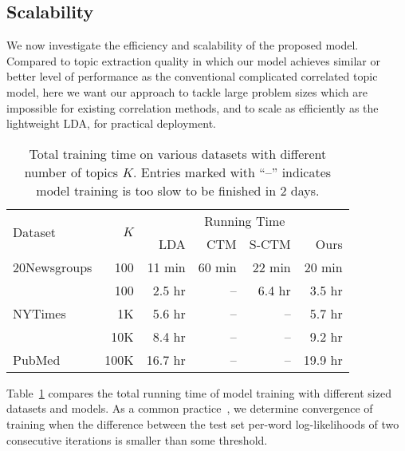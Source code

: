 \documentclass[sigconf]{acmart}
\begin{document}
\subsection{Scalability}
We now investigate the efficiency and scalability of the proposed model. Compared to topic extraction quality in which our model achieves similar or better level of performance as the conventional complicated correlated topic model, here we want our approach to tackle large problem sizes which are impossible for existing correlation methods, and to scale as efficiently as the lightweight LDA, for practical deployment.  

\begin{table}[!t]
\centering
\begin{tabular}{l r r r r r}
\cmidrule[\heavyrulewidth]{1-6}
\multirow{2}{*}{Dataset}  & \multirow{2}{*}{$K$}  & \multicolumn{4}{c}{Running Time} \\ \cmidrule(l){3-6}
 & & LDA & CTM & S-CTM & Ours \\ 
\cmidrule[\heavyrulewidth]{1-6}
20Newsgroups  & 100 & 11 min & 60 min & 22 min & 20 min\\
\cmidrule{1-6}
\multirow{3}{*}{NYTimes}     & 100 & 2.5 hr & -- & 6.4 hr & 3.5 hr \\
     & 1K & 5.6 hr & -- & -- & 5.7 hr \\
     & 10K & 8.4 hr & -- & -- & 9.2 hr \\
\cmidrule{1-6}
PubMed     & 100K & 16.7 hr & -- & -- & 19.9 hr \\
\cmidrule[\heavyrulewidth]{1-6}
\end{tabular}
\caption{Total training time on various datasets with different number of topics $K$. Entries marked with ``--'' indicates model training is too slow to be finished in 2 days. }
\label{tab:time}
\vspace{-20pt}
\end{table}
Table~\ref{tab:time} compares the total running time of model training with different sized datasets and models. 
%
As a common practice~\cite{hoffman2013stochastic}, we determine convergence of training when the difference between the test set per-word log-likelihoods of two consecutive iterations is smaller than some threshold.
%
\end{document}

